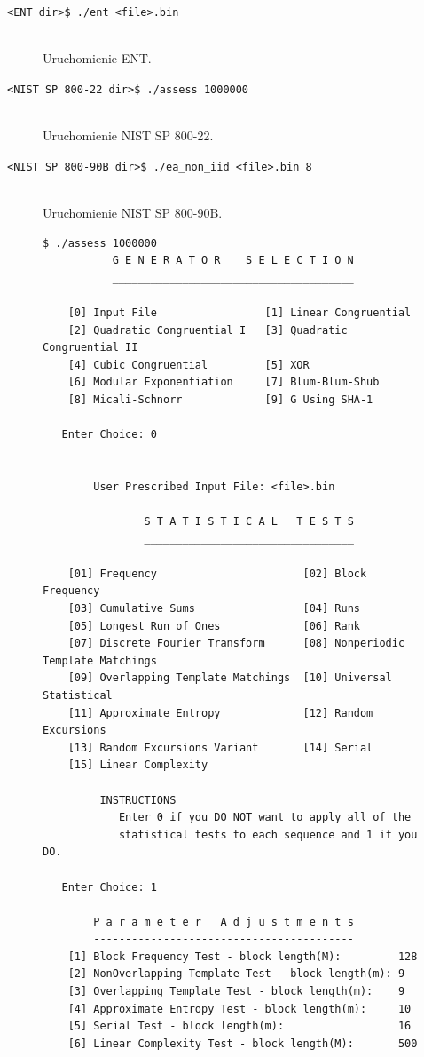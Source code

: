 \begin{description}
    \item[\texttt{<ENT dir>\$ ./ent <file>.bin}] \hfill \\ 
    Uruchomienie ENT.

    \item[\texttt{<NIST SP 800-22 dir>\$ ./assess 1000000}] \hfill \\ 
    Uruchomienie NIST SP 800-22.

    \item[\texttt{<NIST SP 800-90B dir>\$ ./ea\_non\_iid <file>.bin 8}] \hfill \\ 
    Uruchomienie NIST SP 800-90B.
\end{description}

\begin{figure}[H]
    \centering
    \begin{verbatim}
$ ./assess 1000000
           G E N E R A T O R    S E L E C T I O N 
           ______________________________________

    [0] Input File                 [1] Linear Congruential
    [2] Quadratic Congruential I   [3] Quadratic Congruential II
    [4] Cubic Congruential         [5] XOR
    [6] Modular Exponentiation     [7] Blum-Blum-Shub
    [8] Micali-Schnorr             [9] G Using SHA-1

   Enter Choice: 0


        User Prescribed Input File: <file>.bin

                S T A T I S T I C A L   T E S T S
                _________________________________

    [01] Frequency                       [02] Block Frequency
    [03] Cumulative Sums                 [04] Runs
    [05] Longest Run of Ones             [06] Rank
    [07] Discrete Fourier Transform      [08] Nonperiodic Template Matchings
    [09] Overlapping Template Matchings  [10] Universal Statistical
    [11] Approximate Entropy             [12] Random Excursions
    [13] Random Excursions Variant       [14] Serial
    [15] Linear Complexity

         INSTRUCTIONS
            Enter 0 if you DO NOT want to apply all of the
            statistical tests to each sequence and 1 if you DO.

   Enter Choice: 1

        P a r a m e t e r   A d j u s t m e n t s
        -----------------------------------------
    [1] Block Frequency Test - block length(M):         128
    [2] NonOverlapping Template Test - block length(m): 9
    [3] Overlapping Template Test - block length(m):    9
    [4] Approximate Entropy Test - block length(m):     10
    [5] Serial Test - block length(m):                  16
    [6] Linear Complexity Test - block length(M):       500


\end{verbatim}
\end{figure}
